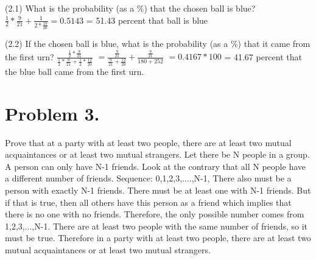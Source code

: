 \documentclass[11pt]{article}
\begin{document}
\noindent
(2.1) What is the probability (as a \%) that the chosen ball is blue?
\newline
\newline
\newline
$\frac{1}{2} * \frac{9}{21} + \frac{1}{2 * \frac{19}{20}} = 0.5143$
\newline
= 51.43 percent that ball is blue
\newline
\newline
\newline
\newline

\noindent
(2.2) If the chosen ball is blue, what is the probability (as a \%) that it
came from the first urn?
\newline
\newline
\newline
$\frac{\frac{1}{2} * \frac{9}{21}}{\frac{1}{2} * \frac{9}{21} + \frac{1}{2} * \frac{12}{20}}$
\newline
\newline
$= \frac{\frac{9}{21}}{\frac{9}{21} + \frac{12}{20}} + \frac{\frac{9}{21}}{180+252}$
\newline
\newline
$= 0.4167 * 100$
\newline
\newline
= 41.67 percent that the blue ball came from the first urn.
\newpage


\section*{Problem 3.}

\noindent
Prove that at a party with at least two people, there are at least two mutual
acquaintances or at least two mutual strangers.
\newline
\newline
Let there be N people in a group. A person can only have N-1 friends. Look at the contrary that all N people have a different number of friends. Sequence: 0,1,2,3,....,N-1, There also must be a person with exactly N-1 friends.
\newline
\newline
There must be at least one with N-1 friends. But if that is true, then all others have this person as a friend which implies that there is no one with no friends. Therefore, the only possible number comes from 1,2,3,...,N-1.
\newline
\newline
There are at least two people with the same number of friends, so it must be true. 
\newline
\newline
Therefore in a party with at least two people, there are at least two mutual acquaintances or at least two mutual strangers.
\newpage
\end{document}
